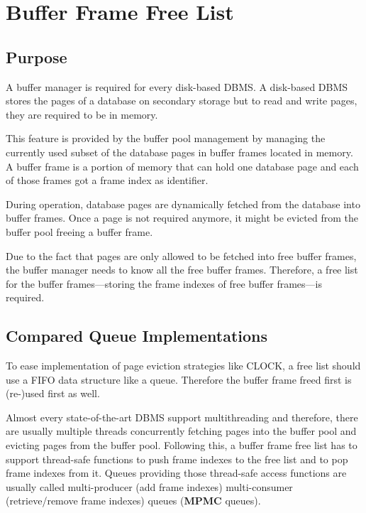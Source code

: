 \chapter[Buffer Frame Free List]{Buffer Frame Free List} \label{ch:free-list}

\section[Purpose]{Purpose}

	A buffer manager is required for every disk-based DBMS. A disk-based DBMS stores the pages of a database on secondary storage but to read and write pages, they are required to be in memory.
	
	This feature is provided by the buffer pool management by managing the currently used subset of the database pages in buffer frames located in memory. A buffer frame is a portion of memory that can hold one database page and each of those frames got a frame index as identifier.
	
	During operation, database pages are dynamically fetched from the database into buffer frames. Once a page is not required anymore, it might be evicted from the buffer pool freeing a buffer frame.
	
	Due to the fact that pages are only allowed to be fetched into free buffer frames, the buffer manager needs to know all the free buffer frames. Therefore, a free list for the buffer frames---storing the frame indexes of free buffer frames---is required.

\section[Compared Queue Implementations]{Compared Queue Implementations}

	To ease implementation of page eviction strategies like CLOCK, a free list should use a FIFO data structure like a queue. Therefore the buffer frame freed first is (re-)used first as well.
	
	Almost every state-of-the-art DBMS support multithreading and therefore, there are usually multiple threads concurrently fetching pages into the buffer pool and evicting pages from the buffer pool. Following this, a buffer frame free list has to support thread-safe functions to push frame indexes to the free list and to pop frame indexes from it. Queues providing those thread-safe access functions are usually called multi-producer (add frame indexes) multi-consumer (retrieve/remove frame indexes) queues (\textbf{MPMC} queues).
	
